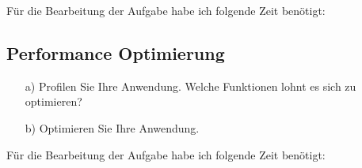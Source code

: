 Für die Bearbeitung der Aufgabe habe ich folgende Zeit benötigt:

\subsection{Performance Optimierung}

\begin{enumerate}

\item[a)] Profilen Sie Ihre Anwendung. Welche Funktionen lohnt es sich zu optimieren? 

\item[b)] Optimieren Sie Ihre Anwendung. 

\end{enumerate}

Für die Bearbeitung der Aufgabe habe ich folgende Zeit benötigt:

